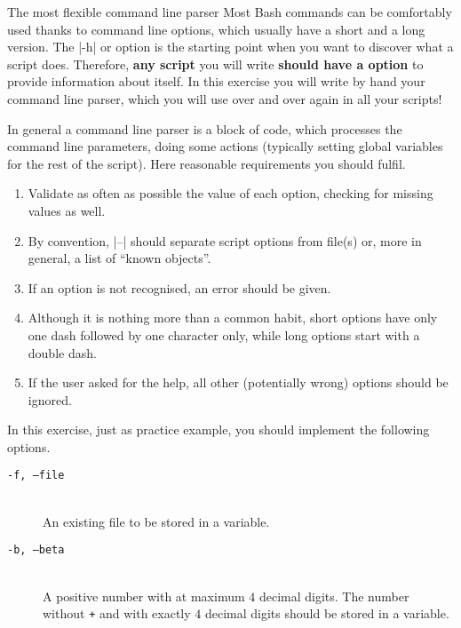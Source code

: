 
\begin{exercise}[Inspirational]{The most flexible command line parser}
    Most Bash commands can be comfortably used thanks to command line options, which usually have a short and a long version.
    The \bash|-h| or  option is the starting point when you want to discover what a script does.
    Therefore, \textbf{any script} you will write \textbf{should have a  option} to provide information about itself.
    In this exercise you will write by hand your command line parser, which you will use over and over again in all your scripts!

    In general a command line parser is a block of code, which processes the command line parameters, doing some actions (typically setting global variables for the rest of the script).
    Here reasonable requirements you should fulfil.
    \begin{enumerate}
        \item Validate as often as possible the value of each option, checking for missing values as well.
        \item By convention, \bash|--| should separate script options from file(s) or, more in general, a list of ``known objects''.
        \item If an option is not recognised, an error should be given.
        \item Although it is nothing more than a common habit, short options have only one dash followed by one character only, while long options start with a double dash.
        \item If the user asked for the help, all other (potentially wrong) options should be ignored.
    \end{enumerate}
    In this exercise, just as practice example, you should implement the following options.
    \begin{description}
        \item[\texttt{-f, --file}] ~\\
            An existing file to be stored in a variable.
        \item[\texttt{-b, --beta}] ~\\
            A positive number with at maximum $4$ decimal digits.
            The number without \texttt{+} and with exactly $4$ decimal digits should be stored in a variable.

\end{description}
\end{exercise}
